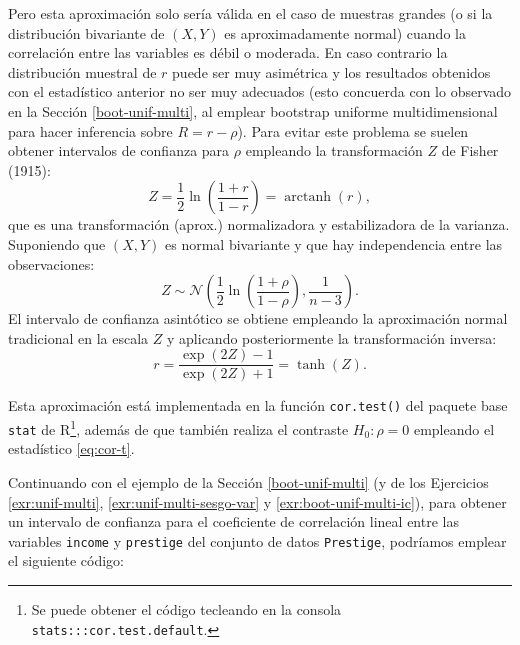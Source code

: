 \documentclass[
]{book}
\newenvironment{Shaded}{\begin{snugshade}}{\end{snugshade}}
\newcommand{\AttributeTok}[1]{\textcolor[rgb]{0.77,0.63,0.00}{#1}}
\newcommand{\CommentTok}[1]{\textcolor[rgb]{0.56,0.35,0.01}{\textit{#1}}}
\newcommand{\FunctionTok}[1]{\textcolor[rgb]{0.00,0.00,0.00}{#1}}
\newcommand{\NormalTok}[1]{#1}
\newcommand{\SpecialCharTok}[1]{\textcolor[rgb]{0.00,0.00,0.00}{#1}}
\newcommand{\StringTok}[1]{\textcolor[rgb]{0.31,0.60,0.02}{#1}}
\theoremstyle{break}
\theoremstyle{nonumberplain}
\renewcommand{\CommentTok}[1]{\textcolor[rgb]{0.41,0.41,0.41}{\texttt{#1}}}
\begin{document}
Pero esta aproximación solo sería válida en el caso de muestras grandes (o si la distribución bivariante de \((X, Y)\) es aproximadamente normal) cuando la correlación entre las variables es débil o moderada.
En caso contrario la distribución muestral de \(r\) puede ser muy asimétrica y los resultados obtenidos con el estadístico anterior no ser muy adecuados (esto concuerda con lo observado en la Sección \ref{boot-unif-multi}, al emplear bootstrap uniforme multidimensional para hacer inferencia sobre \(R = r -\rho\)).
Para evitar este problema se suelen obtener intervalos de confianza para \(\rho\) empleando la transformación \(Z\) de Fisher (1915):
\[Z = \frac{1}{2}\ln \left( \frac{1+r}{1-r} \right) = \operatorname{arctanh}(r),\]
que es una transformación (aprox.) normalizadora y estabilizadora de la varianza.
Suponiendo que \((X, Y)\) es normal bivariante y que hay independencia entre las observaciones:
\[Z \sim \mathcal{N}\left( \frac{1}{2}\ln \left( \frac{1+\rho}{1-\rho} \right), \frac{1}{n-3} \right).\]
El intervalo de confianza asintótico se obtiene empleando la aproximación normal tradicional en la escala \(Z\) y aplicando posteriormente la transformación inversa:
\[r = \frac{\exp(2Z)-1}{\exp(2Z)+1} = \operatorname{tanh}(Z).\]

Esta aproximación está implementada en la función \texttt{cor.test()} del paquete base \texttt{stat} de R\footnote{Se puede obtener el código tecleando en la consola \texttt{stats:::cor.test.default}.}, además de que también realiza el contraste \(H_0: \rho = 0\) empleando el estadístico \eqref{eq:cor-t}.

Continuando con el ejemplo de la Sección \ref{boot-unif-multi} (y de los Ejercicios \ref{exr:unif-multi}, \ref{exr:unif-multi-sesgo-var} y \ref{exr:boot-unif-multi-ic}), para obtener un intervalo de confianza para el coeficiente de correlación lineal entre las variables \texttt{income} y \texttt{prestige} del conjunto de datos \texttt{Prestige}, podríamos emplear el siguiente código:

\begin{Shaded}
\end{Shaded}
\end{document}
